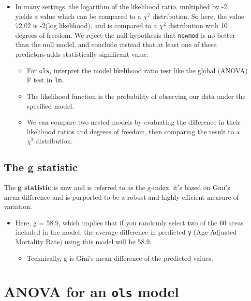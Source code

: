 \documentclass[]{book}
\providecommand{\tightlist}{%
  \setlength{\itemsep}{0pt}\setlength{\parskip}{0pt}}
\theoremstyle{definition}
\theoremstyle{definition}
\theoremstyle{definition}
\theoremstyle{remark}
\begin{document}
\begin{itemize}
\tightlist
\item
  In many settings, the logarithm of the likelihood ratio, multiplied by
  -2, yields a value which can be compared to a \(\chi^2\) distribution.
  So here, the value 72.02 is -2(log likelihood), and is compared to a
  \(\chi^2\) distribution with 10 degrees of freedom. We reject the null
  hypothesis that \texttt{newmod} is no better than the null model, and
  conclude instead that at least one of these predictors adds
  statistically significant value.

  \begin{itemize}
  \tightlist
  \item
    For \texttt{ols}, interpret the model likelihood ratio test like the
    global (ANOVA) F test in \texttt{lm}.
  \item
    The likelihood function is the probability of observing our data
    under the specified model.
  \item
    We can compare two nested models by evaluating the difference in
    their likelihood ratios and degrees of freedom, then comparing the
    result to a \(\chi^2\) distribution.
  \end{itemize}
\end{itemize}

\subsection{The g statistic}\label{the-g-statistic}

The \textbf{g statistic} is new and is referred to as the g-index. it's
based on Gini's mean difference and is purported to be a robust and
highly efficient measure of variation.

\begin{itemize}
\tightlist
\item
  Here, g = 58.9, which implies that if you randomly select two of the
  60 areas included in the model, the average difference in predicted
  \texttt{y} (Age-Adjusted Mortality Rate) using this model will be
  58.9.

  \begin{itemize}
  \tightlist
  \item
    Technically, g is Gini's mean difference of the predicted values.
  \end{itemize}
\end{itemize}

\section{\texorpdfstring{ANOVA for an \texttt{ols}
model}{ANOVA for an ols model}}\label{anova-for-an-ols-model}
\end{document}
